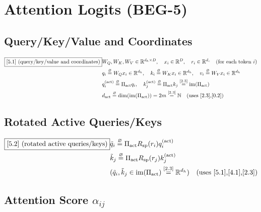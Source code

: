 \documentclass[11pt]{article}
\newcommand{\eqdef}{\overset{\varnothing}{=}}
\newcommand{\eqref}[1]{\overset{[#1]}{=}}
\begin{document}
\section{Attention Logits (BEG-5)}

\subsection{Query/Key/Value and Coordinates}

\begin{align}
\boxed{[5.1] \text{ (query/key/value and coordinates)}}
&W_Q,W_K,W_V
\in
\mathbb{R}^{d_h\times D}
,
\quad
x_i
\in
\mathbb{R}^{D}
,
\quad
r_i
\in
\mathbb{R}^{d_c}
\quad
(\text{for each token }i) \notag\\
&q_i
\eqdef
W_Q x_i
\in
\mathbb{R}^{d_h}
,\quad
k_i
\eqdef
W_K x_i
\in
\mathbb{R}^{d_h}
,\quad
v_i
\eqdef
W_V x_i
\in
\mathbb{R}^{d_h} \notag\\
&q_i^{(\mathrm{act})}
\eqdef
\Pi_{\mathrm{act}} q_i
,\quad
k_j^{(\mathrm{act})}
\eqdef
\Pi_{\mathrm{act}} k_j
\eqref{2.3}
\operatorname{im}(\Pi_{\mathrm{act}}) \notag\\
&d_{\mathrm{act}}
\eqdef
\dim(\operatorname{im}(\Pi_{\mathrm{act}}))
=
2m
\eqref{2.3}
\mathbb{N}
\quad(\text{uses [2.3],[0.2]})
\end{align}

\subsection{Rotated Active Queries/Keys}

\begin{align}
\boxed{[5.2] \text{ (rotated active queries/keys)}}
&\tilde{q}_i
\eqdef
\Pi_{\mathrm{act}}
R_{\mathrm{sp}}(r_i)
q_i^{(\mathrm{act})} \notag\\
&\tilde{k}_j
\eqdef
\Pi_{\mathrm{act}}
R_{\mathrm{sp}}(r_j)
k_j^{(\mathrm{act})} \notag\\
&(\tilde{q}_i,
\tilde{k}_j
\in
\operatorname{im}(\Pi_{\mathrm{act}})
\eqref{2.3}
\mathbb{R}^{d_h})
\quad(\text{uses [5.1],[4.1],[2.3]})
\end{align}

\subsection{Attention Score $\alpha_{ij}$}
\end{document}
